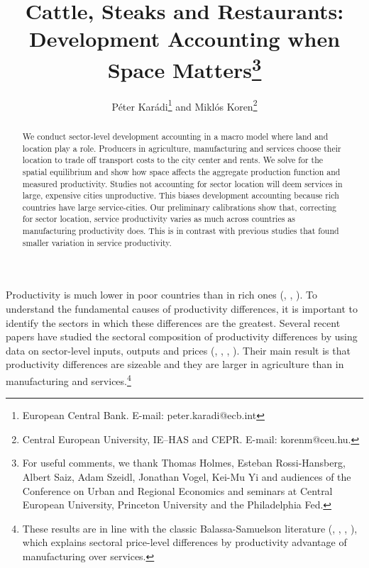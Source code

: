 \documentclass[12pt]{article}
\begin{document}
\title{Cattle, Steaks and Restaurants:\\ Development Accounting when Space Matters\thanks{For useful comments, we thank Thomas Holmes, Esteban Rossi-Hansberg, Albert Saiz, Adam Szeidl, Jonathan Vogel, Kei-Mu Yi and audiences of the Conference on Urban and Regional Economics and seminars at Central European University, Princeton University and the Philadelphia Fed.}}
\author{Péter Karádi\thanks{European Central Bank. E-mail: peter.karadi@ecb.int} and Miklós Koren\thanks{Central European University, IE--HAS and CEPR. E-mail: korenm@ceu.hu.}}
\maketitle

\begin{abstract}
We conduct sector-level development accounting in a macro model where land and location play a role. Producers in agriculture, manufacturing and services choose their location to trade off transport costs to the city center and rents. We solve for the spatial equilibrium and show how space affects the aggregate production function and measured productivity. Studies not accounting for sector location will deem services in large, expensive cities unproductive. This biases development accounting because rich countries have large service-cities. Our preliminary calibrations show that, correcting for sector location, service productivity varies as much across countries as manufacturing productivity does. This is in contrast with previous studies that found smaller variation in service productivity.
\end{abstract}

Productivity is much lower in poor countries than in rich ones (, , ). To understand the fundamental causes of productivity differences, it is important to identify the sectors in which these differences are the greatest. Several recent papers have studied the sectoral composition of productivity differences by using data on sector-level inputs, outputs and prices (, , , ). Their main result is that productivity differences are sizeable and they are larger in agriculture than in manufacturing and services.\footnote{These results are in line with the classic Balassa-Samuelson literature (, , , ), which explains sectoral price-level differences by productivity advantage of manufacturing over services.} 
\end{document}
